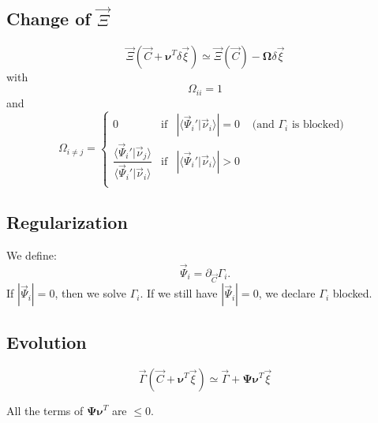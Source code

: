 \documentclass[aps,12pt]{revtex4}
\begin{document}
\subsection{Change of $\vec{\Xi}$}

\begin{equation}
	\vec{\Xi}(\vec{C}+ \bm{\nu}^T  \delta\vec{\xi} ) \simeq  \vec{\Xi}(\vec{C}) -
	\bm{\Omega}
	\delta\vec{\xi}
\end{equation}  
with
\begin{equation}
	\Omega_{ii} = 1
\end{equation}
and
\begin{equation}
\Omega_{i\not=j} = 
\left\lbrace
	\begin{array}{ccll}
	0 & \text{if} & |\langle \vec{\Psi}_i'  \vert \vec{\nu}_i \rangle| = 0 & \text{ (and $\Gamma_i$ is blocked) }\\
	\dfrac{\langle \vec{\Psi}_i'  \vert \vec{\nu}_j \rangle}{\langle \vec{\Psi}_i'  \vert \vec{\nu}_i \rangle}
	 & \text{if} & |\langle \vec{\Psi}_i'  \vert \vec{\nu}_i \rangle| > 0
	 & \\
	\end{array}
\right.
\end{equation}


 	 	
\subsection{Regularization}
We define:
\begin{equation}
\vec{\Psi}_i = \partial_{\vec{C}} \Gamma_i.
\end{equation}
If $|\vec{\Psi}_i|=0$, then we solve $\Gamma_i$. If we still have $|\vec{\Psi}_i|=0$, we declare $\Gamma_i$ blocked.

\subsection{Evolution}

\begin{equation}
	\vec{\Gamma}(\vec{C}+\bm{\nu}^T \vec{\xi}) \simeq \vec{\Gamma} + \bm{\Psi} \bm{\nu}^T \vec{\xi}
\end{equation}	

All the terms of $	\bm{\Psi} \bm{\nu}^T $ are $\leq 0$.




 


 
\end{document}
